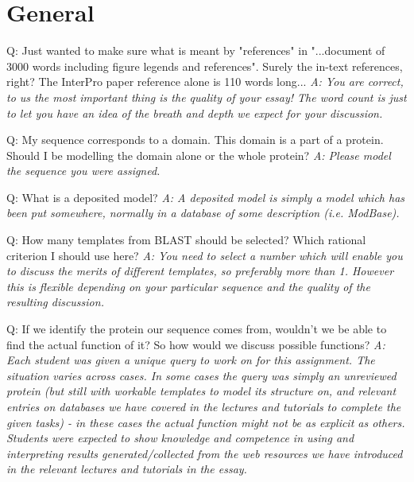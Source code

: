 \documentclass[10pt,a4paper]{article}
\begin{document}
\section{General}
Q: Just wanted to make sure what is meant by "references" in "...document of 3000 words including figure legends and references". Surely the in-text references, right? The InterPro paper reference alone is 110 words long... \newline
\textit{A: You are correct, to us the most important thing is the quality of your essay! The word count is just to let you have an idea of the breath and depth we expect for your discussion.} \newline

Q: My sequence corresponds to a domain. This domain is a part of a protein. Should I be modelling the domain alone or the whole protein? \newline
\textit{A: Please model the sequence you were assigned.} \newline


Q: What is a deposited model? \newline
\textit{A: A deposited model is simply a model which has been put somewhere, normally in a database of some description (i.e. ModBase).} \newline

Q: How many templates from BLAST should be selected? Which rational criterion I should use here? \newline
\textit{A: You need to select a number which will enable you to discuss the merits of different templates, so preferably more than 1. However this is flexible depending on your particular sequence and the quality of the resulting discussion.} \newline

Q:  If we identify the protein our sequence comes from, wouldn't we be able to find the actual function of it? So how would we discuss possible functions? \newline
\textit{A: Each student was given a unique query to work on for this assignment. The situation varies across cases. In some cases the query was simply an unreviewed protein (but still with workable templates to model its structure on, and relevant entries on databases we have covered in the lectures and tutorials to complete the given tasks) - in these cases the actual function might not be as explicit as others. Students were expected to show knowledge and competence in using and interpreting results generated/collected from the web resources we have introduced in the relevant lectures and tutorials in the essay. } \newline
\end{document}
